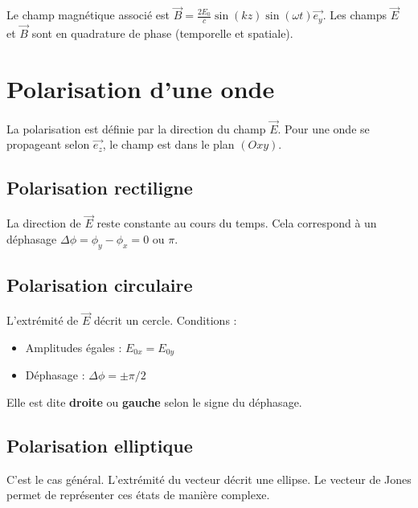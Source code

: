 \documentclass[french]{yLectureNote}
\renewcommand{\vec}{\overrightarrow}
\begin{document}

\begin{proposition}
Le champ magnétique associé est $\vec{B} = \frac{2E_0}{c} \sin(kz) \sin(\omega t) \vec{e_y}$. Les champs $\vec{E}$ et $\vec{B}$ sont en quadrature de phase (temporelle et spatiale).
\end{proposition}

\section{Polarisation d'une onde}



La polarisation est définie par la direction du champ $\vec{E}$. Pour une onde se propageant selon $\vec{e_z}$, le champ est dans le plan $(Oxy)$.

\subsection{Polarisation rectiligne}
La direction de $\vec{E}$ reste constante au cours du temps. Cela correspond à un déphasage $\Delta\phi = \phi_y - \phi_x = 0$ ou $\pi$.

\subsection{Polarisation circulaire}
L'extrémité de $\vec{E}$ décrit un cercle. Conditions :
\begin{itemize}
    \item Amplitudes égales : $E_{0x} = E_{0y}$
    \item Déphasage : $\Delta\phi = \pm \pi/2$
\end{itemize}
Elle est dite \textbf{droite} ou \textbf{gauche} selon le signe du déphasage.

\subsection{Polarisation elliptique}
C'est le cas général. L'extrémité du vecteur décrit une ellipse. Le vecteur de Jones permet de représenter ces états de manière complexe.
\end{document}
